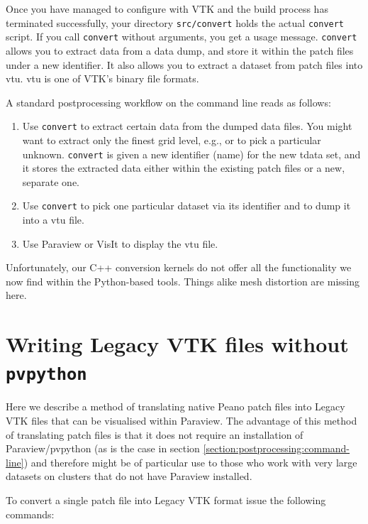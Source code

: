 \noindent
Once you have managed to configure with VTK and the build process has terminated
successfully, your directory \texttt{src/convert} holds the actual \texttt{convert}
script.
If you call \texttt{convert} without arguments, you get a usage message.
\texttt{convert} allows you to extract data from a data dump, and store it
within the patch files under a new identifier.
It also allows you to extract a dataset from patch files into vtu.
vtu is one of VTK's binary file formats.


A standard postprocessing workflow on the command line reads as follows:
\begin{enumerate}
  \item Use \texttt{convert} to extract certain data from the dumped data files.
  You might want to extract only the finest grid level, e.g., or to pick a
  particular unknown. \texttt{convert} is given a new identifier (name) for the
  new tdata set, and it stores the extracted data either within the existing
  patch files or a new, separate one.
  \item Use \texttt{convert} to pick one particular dataset via its identifier
  and to dump it into a vtu file.
  \item Use Paraview or VisIt to display the vtu file.
\end{enumerate}

\begin{remark}
 Unfortunately, our C++ conversion kernels do not offer all the functionality we
 now find within the Python-based tools. Things alike mesh distortion are
 missing here.
\end{remark}

\section{Writing Legacy VTK files without \texttt{pvpython}}
\label{section:postprocessing:legacy-vtk}

Here we describe a method of translating native Peano patch files into Legacy VTK files that can be visualised within Paraview. The advantage of this method of translating patch files is that it does not require an installation of Paraview/pvpython (as is the case in section \ref{section:postprocessing:command-line}) and therefore might be of particular use to those who work with very large datasets on clusters that do not have Paraview installed.

To convert a single patch file into Legacy VTK format issue the following commands:


